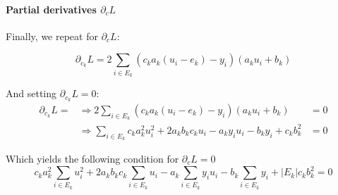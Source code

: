 \paragraph{Partial derivatives $\partial_c L$} Finally, we repeat for $\partial_c L$:

\begin{equation}\label{eq:partial_b}
    \partial_{c_k} L = 2 \sum_{i \in E_k} (c_k a_k(u_i - e_k) - y_i) (a_k u_i + b_k)
\end{equation}

And setting $\partial_{c_k} L = 0$:
\begin{align}
    \partial_{c_k} L = & \Rightarrow 2 \sum_{i \in E_k} (c_k a_k(u_i - e_k) - y_i) (a_ku_i + b_k) &= 0 \\
                       & \Rightarrow   \sum_{i \in E_k} c_k a_k^2 u_i^2 + 2 a_k b_k c_k u_i - a_k y_i u_i - b_k y_i + c_k b_k^2 &= 0
\end{align}

Which yields the following condition for $\partial_{c} L = 0$
\begin{equation}
   c_k a_k^2     \sum_{i \in E_k} u_i^2   + 
   2 a_k b_k c_k \sum_{i \in E_k} u_i     -
   a_k           \sum_{i \in E_k} y_i u_i -
   b_k           \sum_{i \in E_k} y_i     + 
   |E_k| c_k b_k^2 = 0 \label{eq:grad_ck_zero}
\end{equation}



